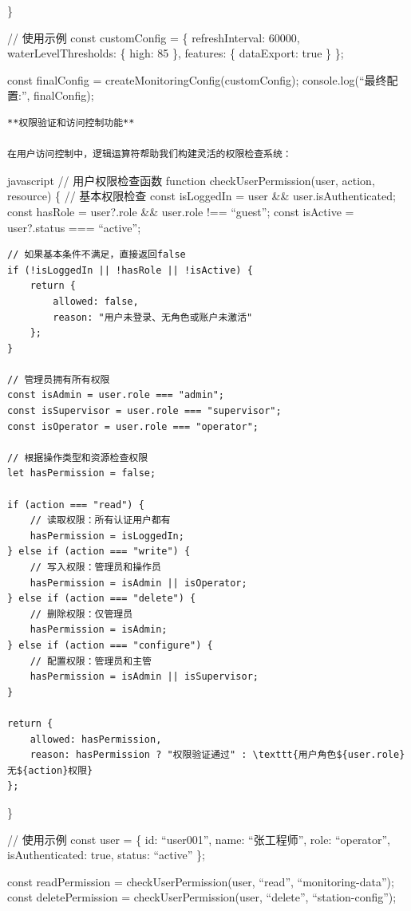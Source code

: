 \}

// 使用示例 const customConfig = \{ refreshInterval: 60000, waterLevelThresholds: \{ high: 85 \}, features: \{ dataExport: true \} \};

const finalConfig = createMonitoringConfig(customConfig); console.log(``最终配置:'', finalConfig);

\begin{lstlisting}
**权限验证和访问控制功能**

在用户访问控制中，逻辑运算符帮助我们构建灵活的权限检查系统：
\end{lstlisting}

javascript // 用户权限检查函数 function checkUserPermission(user, action, resource) \{ // 基本权限检查 const isLoggedIn = user \&\& user.isAuthenticated; const hasRole = user?.role \&\& user.role !== ``guest''; const isActive = user?.status === ``active'';

\begin{verbatim}
// 如果基本条件不满足，直接返回false
if (!isLoggedIn || !hasRole || !isActive) {
    return {
        allowed: false,
        reason: "用户未登录、无角色或账户未激活"
    };
}

// 管理员拥有所有权限
const isAdmin = user.role === "admin";
const isSupervisor = user.role === "supervisor";
const isOperator = user.role === "operator";

// 根据操作类型和资源检查权限
let hasPermission = false;

if (action === "read") {
    // 读取权限：所有认证用户都有
    hasPermission = isLoggedIn;
} else if (action === "write") {
    // 写入权限：管理员和操作员
    hasPermission = isAdmin || isOperator;
} else if (action === "delete") {
    // 删除权限：仅管理员
    hasPermission = isAdmin;
} else if (action === "configure") {
    // 配置权限：管理员和主管
    hasPermission = isAdmin || isSupervisor;
}

return {
    allowed: hasPermission,
    reason: hasPermission ? "权限验证通过" : \texttt{用户角色${user.role}无${action}权限}
};
\end{verbatim}

\}

// 使用示例 const user = \{ id: ``user001'', name: ``张工程师'', role: ``operator'', isAuthenticated: true, status: ``active'' \};

const readPermission = checkUserPermission(user, ``read'', ``monitoring-data''); const deletePermission = checkUserPermission(user, ``delete'', ``station-config'');

